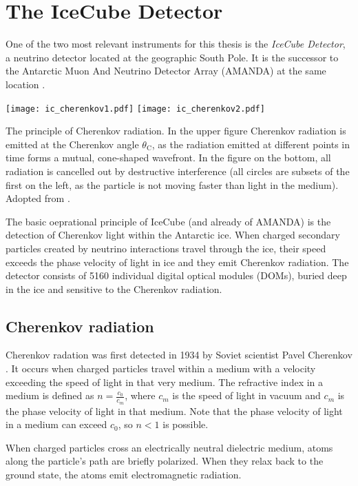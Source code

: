 \chapter{The IceCube Detector} \label{ic}
One of the two most relevant instruments for this thesis is the \textit{IceCube Detector}, a neutrino detector located at the geographic South Pole. It is the successor to the Antarctic Muon And Neutrino Detector Array (AMANDA) at the same location . 
\begin{marginfigure}
    \texttt{[image: ic\_cherenkov1.pdf]}
    \texttt{[image: ic\_cherenkov2.pdf]}
    \caption[Cherenkov radiation]{The principle of Cherenkov radiation. In the upper figure Cherenkov radiation is emitted at the Cherenkov angle $\theta_\text{C}$, as the radiation emitted at different points in time forms a mutual, cone-shaped wavefront. In the figure on the bottom, all radiation is cancelled out by destructive interference (all circles are subsets of the first on the left, as the particle is not moving faster than light in the medium). Adopted from \cite{LAnnunziata2020}.}
\end{marginfigure}
The basic oeprational principle of IceCube (and already of AMANDA) is the detection of Cherenkov light within the Antarctic ice. When charged secondary particles created by neutrino interactions travel through the ice, their speed exceeds the phase velocity of light in ice and they emit Cherenkov radiation. The detector consists of 5160 individual digital optical modules (DOMs), buried deep in the ice and sensitive to the Cherenkov radiation.

\section{Cherenkov radiation} \label{cherenkov_radiation}

Cherenkov radation was first detected in 1934 by Soviet scientist Pavel Cherenkov . It occurs when charged particles travel within a medium with a velocity exceeding the speed of light in that very medium. The refractive index in a medium is defined as $n=\frac{c_0}{c_m}$, where $c_m$ is the speed of light in vacuum and $c_m$ is the phase velocity of light in that medium. Note that the phase velocity of light in a medium can exceed $c_0$, so $n<1$ is possible. 

When charged particles cross an electrically neutral dielectric medium, atoms along the particle's path are briefly polarized. When they relax back to the ground state, the atoms emit electromagnetic radiation.

